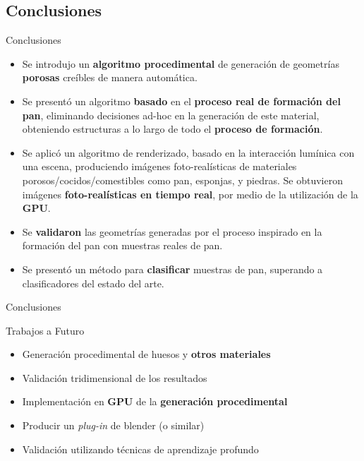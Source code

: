 \documentclass[spanish,unknownkeysallowed,10pt]{beamer}
\begin{document}
\subsection{Conclusiones}
\begin{frame}{Conclusiones}
\begin{block}{}
\begin{itemize}
\item Se introdujo un \textbf{algoritmo procedimental} de generación de geometrías \textbf{porosas} creíbles de manera automática.
\item Se presentó un algoritmo \textbf{basado} en el \textbf{proceso real de formación del pan}, eliminando decisiones ad-hoc en la generación de este material, obteniendo estructuras a lo largo de todo el \textbf{proceso de formación}.
\item Se aplicó un algoritmo de renderizado, basado en la interacción lumínica con una escena, produciendo imágenes foto-realísticas de materiales porosos/cocidos/comestibles como pan, esponjas, y piedras. Se obtuvieron imágenes \textbf{foto-realísticas en tiempo real}, por medio de la utilización de la \textbf{GPU}.
\item Se \textbf{validaron} las geometrías generadas por el proceso inspirado en la formación del pan con muestras reales de pan.
\item Se presentó un método para \textbf{clasificar} muestras de pan, superando a clasificadores del estado del arte.
\end{itemize}
\end{block}
\end{frame}

\begin{frame}{Conclusiones}
\begin{block}{Trabajos a Futuro}
\begin{itemize}
\item Generación procedimental de huesos y \textbf{otros materiales}
\item Validación tridimensional de los resultados
\item Implementación en \textbf{GPU} de la \textbf{generación procedimental}
\item Producir un {\it plug-in} de blender (o similar)
\item Validación utilizando técnicas de aprendizaje profundo
\end{itemize}
\end{block}
\end{frame}
\end{document}
